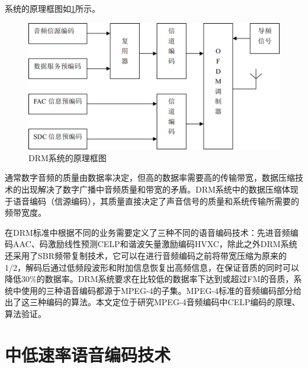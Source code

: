 系统的原理框图如\ref{fig:diagram}所示。

\begin{figure}
	\centering
	\includegraphics[width=\textwidth]{figures/figure1}
	\caption{DRM系统的原理框图}\label{fig:diagram}
\end{figure}

通常数字音频的质量由数据率决定，但高的数据率需要高的传输带宽，数据压缩技术的出现解决了数字广播中音频质量和带宽的矛盾。DRM系统中的数据压缩体现于语音编码（信源编码），其质量直接决定了声音信号的质量和系统传输所需要的频带宽度。

在DRM标准中根据不同的业务需要定义了三种不同的语音编码技术：先进音频编码AAC、码激励线性预测CELP和谐波矢量激励编码HVXC，除此之外DRM系统还采用了SBR频带复制技术，它可以在进行音频编码之前将带宽压缩为原来的1/2，解码后通过低频段波形和附加信息恢复出高频信息，在保证音质的同时可以降低30\%的数据率。DRM系统要求在比较低的数据率下达到或超过FM的音质，系统中使用的三种语音编码都源于MPEG-4的子集。MPEG-4标准的音频编码部分给出了这三种编码的算法。本文定位于研究MPEG-4音频编码中CELP编码的原理、算法验证。




\section{中低速率语音编码技术}

